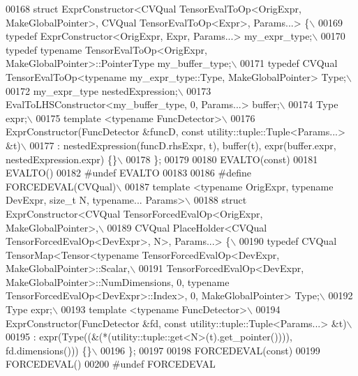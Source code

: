 \begin{DoxyCode}
00168 \textcolor{preprocessor}{struct ExprConstructor<CVQual TensorEvalToOp<OrigExpr, MakeGlobalPointer>, CVQual TensorEvalToOp<Expr>,
       Params...> \{\(\backslash\)}
00169 \textcolor{preprocessor}{  typedef ExprConstructor<OrigExpr, Expr, Params...> my\_expr\_type;\(\backslash\)}
00170 \textcolor{preprocessor}{  typedef typename TensorEvalToOp<OrigExpr, MakeGlobalPointer>::PointerType my\_buffer\_type;\(\backslash\)}
00171 \textcolor{preprocessor}{  typedef CVQual TensorEvalToOp<typename my\_expr\_type::Type, MakeGlobalPointer> Type;\(\backslash\)}
00172 \textcolor{preprocessor}{  my\_expr\_type nestedExpression;\(\backslash\)}
00173 \textcolor{preprocessor}{  EvalToLHSConstructor<my\_buffer\_type, 0, Params...> buffer;\(\backslash\)}
00174 \textcolor{preprocessor}{  Type expr;\(\backslash\)}
00175 \textcolor{preprocessor}{  template <typename FuncDetector>\(\backslash\)}
00176 \textcolor{preprocessor}{  ExprConstructor(FuncDetector &funcD, const utility::tuple::Tuple<Params...> &t)\(\backslash\)}
00177 \textcolor{preprocessor}{  : nestedExpression(funcD.rhsExpr, t), buffer(t), expr(buffer.expr, nestedExpression.expr) \{\}\(\backslash\)}
00178 \textcolor{preprocessor}{\};}
00179 
00180 EVALTO(\textcolor{keyword}{const})
00181 EVALTO()
00182 \textcolor{preprocessor}{#undef EVALTO}
00183 
00186 \textcolor{preprocessor}{#define FORCEDEVAL(CVQual)\(\backslash\)}
00187 \textcolor{preprocessor}{template <typename OrigExpr, typename DevExpr, size\_t N, typename... Params>\(\backslash\)}
00188 \textcolor{preprocessor}{struct ExprConstructor<CVQual TensorForcedEvalOp<OrigExpr, MakeGlobalPointer>,\(\backslash\)}
00189 \textcolor{preprocessor}{CVQual PlaceHolder<CVQual TensorForcedEvalOp<DevExpr>, N>, Params...> \{\(\backslash\)}
00190 \textcolor{preprocessor}{  typedef CVQual TensorMap<Tensor<typename TensorForcedEvalOp<DevExpr, MakeGlobalPointer>::Scalar,\(\backslash\)}
00191 \textcolor{preprocessor}{  TensorForcedEvalOp<DevExpr, MakeGlobalPointer>::NumDimensions, 0, typename
       TensorForcedEvalOp<DevExpr>::Index>, 0, MakeGlobalPointer> Type;\(\backslash\)}
00192 \textcolor{preprocessor}{  Type expr;\(\backslash\)}
00193 \textcolor{preprocessor}{  template <typename FuncDetector>\(\backslash\)}
00194 \textcolor{preprocessor}{  ExprConstructor(FuncDetector &fd, const utility::tuple::Tuple<Params...> &t)\(\backslash\)}
00195 \textcolor{preprocessor}{  : expr(Type((&(*(utility::tuple::get<N>(t).get\_pointer()))), fd.dimensions())) \{\}\(\backslash\)}
00196 \textcolor{preprocessor}{\};}
00197 
00198 FORCEDEVAL(\textcolor{keyword}{const})
00199 FORCEDEVAL()
00200 \textcolor{preprocessor}{#undef FORCEDEVAL}

\end{DoxyCode}
